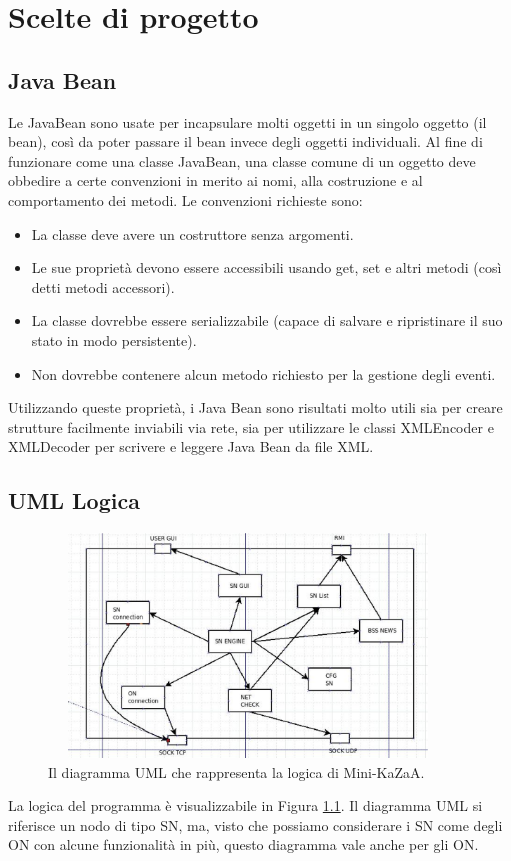 \chapter{Scelte di progetto}

\section{Java Bean}\label{sec:java_bean}
Le JavaBean sono usate per incapsulare molti oggetti in un singolo oggetto (il bean), così da poter passare il bean invece degli oggetti individuali.
Al fine di funzionare come una classe JavaBean, una classe comune di un oggetto deve obbedire a certe convenzioni in merito ai nomi, alla costruzione e al comportamento dei metodi. 
Le convenzioni richieste sono:
\begin{itemize}
    \item La classe deve avere un costruttore senza argomenti.
    \item Le sue proprietà devono essere accessibili usando get, set e altri metodi (così detti metodi accessori).
    \item La classe dovrebbe essere serializzabile (capace di salvare e ripristinare il suo stato in modo persistente).
    \item Non dovrebbe contenere alcun metodo richiesto per la gestione degli eventi.
\end{itemize}

Utilizzando queste proprietà, i Java Bean sono risultati molto utili sia per creare strutture facilmente inviabili via rete, sia per utilizzare le classi XMLEncoder e XMLDecoder per scrivere e leggere Java Bean da file XML.

\section{UML Logica}\label{sec:UML_logica}
\begin{figure}[t]
 \centering
 \includegraphics[width=400px,height=225px,bb=14 14 593 376]{images/logica_uml.eps}
 \caption{Il diagramma UML che rappresenta la logica di Mini-KaZaA.}
 \label{fig:logica_uml}
\end{figure}
La logica del programma è visualizzabile in Figura \ref{fig:logica_uml}.
Il diagramma UML si riferisce un nodo di tipo SN, ma, visto che possiamo considerare i SN come degli ON con alcune funzionalità in più, questo diagramma vale anche per gli ON.

